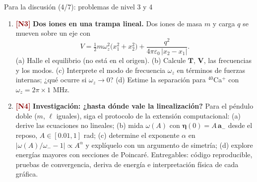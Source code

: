 \documentclass[spanish]{beamer}
\newcommand{\Tm}{\mathbf{T}}              %
\newcommand{\Vm}{\mathbf{V}}              %
\newcommand{\bfeta}{\boldsymbol{\eta}}    %
\newcommand{\ba}{\boldsymbol{a}}          %
\newcommand{\nivel}[1]{\textcolor{darkred}{\textbf{[N#1]}}}
\begin{document}
\begin{frame}{Para la discusión (4/7): problemas de nivel 3 y 4}
\footnotesize
\begin{enumerate}
\item[P5] \nivel{3} \textbf{Dos iones en una trampa lineal.} Dos iones de masa $m$ y carga $q$ se mueven sobre un eje con
\[
V=\tfrac12m\omega_z^2\big(x_1^2+x_2^2\big)+\frac{q^2}{4\pi\varepsilon_0\,|x_2-x_1|}.
\]
(a) Halle el equilibrio (no está en el origen). (b) Calcule $\Tm$, $\Vm$, las frecuencias y los modos. (c) Interprete el modo de frecuencia $\omega_z$ en términos de fuerzas internas; ¿qué ocurre si $\omega_z\to0$? (d) Estime la separación para $^{40}$Ca$^+$ con $\omega_z=2\pi\times1$ MHz.
\item[P6] \nivel{4} \textbf{Investigación: ¿hasta dónde vale la linealización?} Para el péndulo doble ($m$, $\ell$ iguales), siga el protocolo de la extensión computacional:
(a) derive las ecuaciones no lineales; (b) mida $\omega(A)$ con $\bfeta(0)=A\,\ba_-$ desde el reposo, $A\in[0.01,1]$ rad; (c) determine el exponente $\alpha$ en $|\omega(A)/\omega_--1|\propto A^\alpha$ y explíquelo con un argumento de simetría; (d) explore energías mayores con secciones de Poincaré.
Entregables: código reproducible, pruebas de convergencia, deriva de energía e interpretación física de cada gráfica.
\end{enumerate}
\end{frame}
\end{document}
